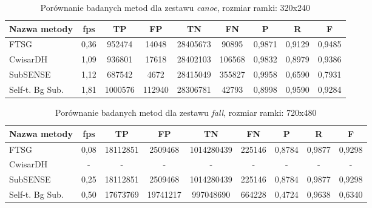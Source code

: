 \begin{table}[!h]
\small
\caption{Porównanie badanych metod dla zestawu \textit{canoe}, rozmiar ramki: 320x240}
\label{tab:resultsCanoe}
\centering
\begin{tabular*}{\textwidth}{@{\extracolsep{\fill}} |l*{8}{|c}|}
  \hline 
  \textbf{Nazwa metody} & \textbf{fps} & \textbf{TP} & \textbf{FP} & \textbf{TN} & \textbf{FN} & \textbf{P} & \textbf{R} & \textbf{F}\\
  \hline
  FTSG & 0,36 & 952474 & 14048 & 28405673 & 90895 & 0,9871 & 0,9129 & 0,9485\\ 
\hline
CwisarDH & 1,09 & 936801 & 17618 & 28402103 & 106568 & 0,9832 & 0,8979 & 0,9386\\ 
\hline
SubSENSE & 1,12 & 687542 & 4672 & 28415049 & 355827 & 0,9958 & 0,6590 & 0,7931\\ 
\hline
Self-t. Bg Sub. & 1,81 & 1000576 & 112940 & 28306781 & 42793 & 0,8998 & 0,9590 & 0,9284\\ 
\hline
\end{tabular*}
\end{table}

\begin{table}[!h]
\footnotesize
\caption{Porównanie badanych metod dla zestawu \textit{fall}, rozmiar ramki: 720x480}
\label{tab:resultsFall}
\centering
\begin{tabular*}{\textwidth}{@{\extracolsep{\fill}} |l*{8}{|c}|}
  \hline 
  \textbf{Nazwa metody} & \textbf{fps} & \textbf{TP} & \textbf{FP} & \textbf{TN} & \textbf{FN} & \textbf{P} & \textbf{R} & \textbf{F}\\
  \hline
  FTSG & 0,08 & 18112851 & 2509468 & 1014280439 & 225146 & 0,8784 & 0,9877 & 0,9298\\ 
\hline
CwisarDH & - & - & - & - & - & - & - & -\\ 
\hline
SubSENSE & 0,25 & 18112851 & 2509468 & 1014280439 & 225146 & 0,8784 & 0,9877 & 0,9298\\ 
\hline
Self-t. Bg Sub. & 0,50 & 17673769 & 19741217 & 997048690 & 664228 & 0,4724 & 0,9638 & 0,6340\\ 
\hline
\end{tabular*}
\end{table}

